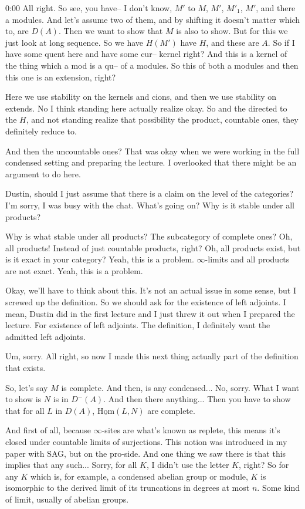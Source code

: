 \begin{unfinished}{0:00}
All right. So see, you have-- I don't know, $M'$ to $M$, $M'$, $M'_1$, $M'$, and there a modules. And let's assume two of them, and by shifting it doesn't matter which to, are $D(A)$. Then we want to show that $M$ is also to show. But for this we just look at long sequence. So we have $H(M')$ have $H$, and these are $A$. So if I have some quent here and have some cur-- kernel right? And this is a kernel of the thing which a mod is a qu-- of a modules. So this of both a modules and then this one is an extension, right?

Here we use stability on the kernels and cions, and then we use stability on extends. No I think standing here actually realize okay. So and the directed to the $H$, and not standing realize that possibility the product, countable ones, they definitely reduce to.

And then the uncountable ones? That was okay when we were working in the full condensed setting and preparing the lecture. I overlooked that there might be an argument to do here.

Dustin, should I just assume that there is a claim on the level of the categories? I'm sorry, I was busy with the chat. What's going on? Why is it stable under all products?

Why is what stable under all products? The subcategory of complete ones? Oh, all products! Instead of just countable products, right? Oh, all products exist, but is it exact in your category? Yeah, this is a problem. $\infty$-limits and all products are not exact. Yeah, this is a problem.

Okay, we'll have to think about this. It's not an actual issue in some sense, but I screwed up the definition. So we should ask for the existence of left adjoints. I mean, Dustin did in the first lecture and I just threw it out when I prepared the lecture. For existence of left adjoints. The definition, I definitely want the admitted left adjoints.

Um, sorry. All right, so now I made this next thing actually part of the definition that exists.

So, let's say $M$ is complete. And then, is any condensed... No, sorry. What I want to show is $N$ is in $D^-(A)$. And then there anything... Then you have to show that for all $L$ in $D(A)$, $\underline{\mathrm{Hom}}(L,N)$ are complete.

And first of all, because $\infty$-sites are what's known as replete, this means it's closed under countable limits of surjections. This notion was introduced in my paper with SAG, but on the pro-side. And one thing we saw there is that this implies that any such... Sorry, for all $K$, I didn't use the letter $K$, right? So for any $K$ which is, for example, a condensed abelian group or module, $K$ is isomorphic to the derived limit of its truncations in degrees at most $n$. Some kind of limit, usually of abelian groups.


\end{unfinished}
